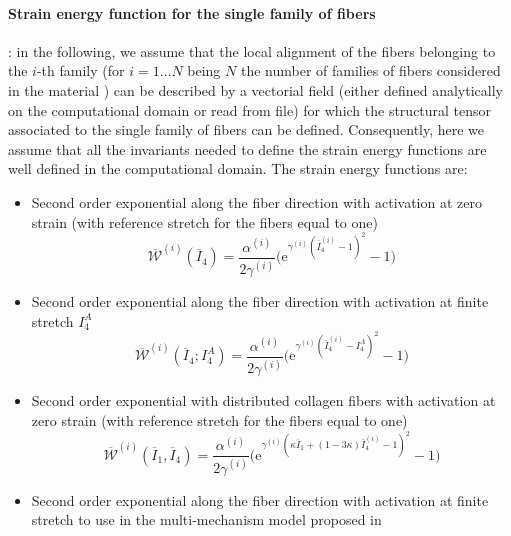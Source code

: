\documentclass[a4paper, 10pt,twoside]{article}
\theoremstyle{plain}
\theoremstyle{definition}
\theoremstyle{remark}
\newcommand{\isoWe}{\overline{\mathcal{W}}}
\begin{document}
\paragraph{Strain energy function for the single family of fibers}: in the following, we assume that the local alignment of the fibers belonging to the $i$-th family (for $i=1\ldots N$ being $N$ the number of families of fibers considered in the material \cite{book::Holzapfel2000}) can be described by a vectorial field (either defined analytically on the computational domain or read from file) for which the structural tensor associated to the single family of fibers \cite{book::Holzapfel2000} can be defined. Consequently, here we assume that all the invariants needed to define the strain energy functions are well defined in the computational domain. The strain energy functions are:
\begin{itemize}
\item Second order exponential along the fiber direction with activation at zero strain (with reference stretch for the fibers equal to one)
  \begin{equation}
    \displaystyle \isoWe^{(i)}\left( \overline{I}_4 \right) = \displaystyle  \frac{\alpha^{(i)}}{2\gamma^{(i)}}\bigg( \text{e}^{\gamma^{(i)}( \overline{I}_4^{(i)}-1)^2} - 1\bigg)
    \label{singleFour}
  \end{equation}
\item Second order exponential along the fiber direction with activation at finite stretch $I_4^{A}$
  \begin{equation}
    \displaystyle \isoWe^{(i)}\left( \overline{I}_4;I_4^{A} \right) = \displaystyle  \frac{\alpha^{(i)}}{2\gamma^{(i)}}\bigg( \text{e}^{\gamma^{(i)}( \overline{I}_4^{(i)}-I_4^{A})^2} - 1\bigg)
  \end{equation}
\item Second order exponential with distributed collagen fibers with activation at zero strain (with reference stretch for the fibers equal to one)
  \begin{equation}
    \displaystyle \isoWe^{(i)}\left( \overline{I}_1,\overline{I}_4 \right) = \displaystyle  \frac{\alpha^{(i)}}{2\gamma^{(i)}}\bigg( \text{e}^{\gamma^{(i)}( \kappa \overline{I}_1 + (1-3\kappa)\overline{I}_4^{(i)}-1)^2} - 1\bigg)
  \end{equation}
\item Second order exponential along the fiber direction with activation at finite stretch to use in the multi-mechanism model proposed in \cite{thesis::DalongLi}
  \begin{equation}

\end{equation}
\end{itemize}
\end{document}
